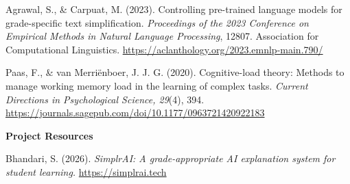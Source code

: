\documentclass[11pt,letterpaper]{article}
\begin{document}
\begin{list}{}{%
  \setlength{\leftmargin}{1.4em}
  \setlength{\itemindent}{-1.4em}
  \setlength{\itemsep}{0.35em}
  \setlength{\parsep}{0pt}
}

\item Agrawal, S., \& Carpuat, M. (2023). Controlling pre-trained language
models for grade-specific text simplification. \textit{Proceedings of the 2023
Conference on Empirical Methods in Natural Language Processing}, 12807. Association for Computational Linguistics.
\url{https://aclanthology.org/2023.emnlp-main.790/}

\item Paas, F., \& van Merri\"enboer, J. J. G. (2020). Cognitive-load theory:
Methods to manage working memory load in the learning of complex tasks.
\textit{Current Directions in Psychological Science, 29}(4), 394.
\url{https://journals.sagepub.com/doi/10.1177/0963721420922183}

\end{list}

\vspace{0.7em}
{\sffamily\bfseries\small\color{accent}Project Resources}\vspace{-0.2em}

\begin{list}{}{%
  \setlength{\leftmargin}{1.4em}
  \setlength{\itemindent}{-1.4em}
  \setlength{\itemsep}{0.35em}
  \setlength{\parsep}{0pt}
}

\item Bhandari, S. (2026). \textit{SimplrAI: A grade-appropriate AI explanation
system for student learning.} \url{https://simplrai.tech}

\end{list}
\end{document}
